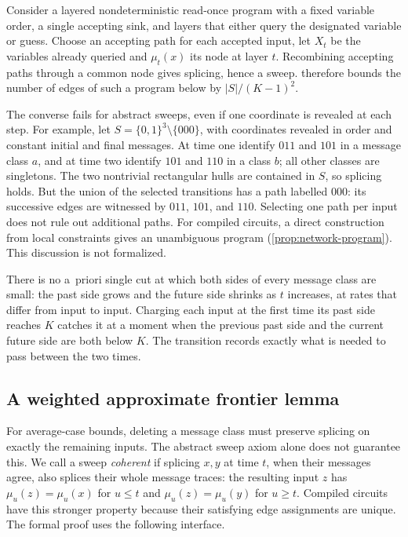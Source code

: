 \documentclass[11pt]{article}
\theoremstyle{plain}
\theoremstyle{definition}
\theoremstyle{remark}
\newcommand{\card}[1]{\lvert #1\rvert}
\begin{document}
\begin{remark}
\label{rem:programs}
Consider a layered nondeterministic read-once program with a fixed variable order, a single
accepting sink, and layers that either query the designated variable or guess. Choose an
accepting path for each accepted input, let $X_t$ be the variables already queried and
$\mu_t(x)$ its node at layer $t$. Recombining accepting paths through a common node gives
splicing, hence a sweep.  therefore bounds the number of edges of such a
program below by $\card S/(K-1)^2$.

The converse fails for abstract sweeps, even if one coordinate is revealed at each step. For
example, let $S=\{0,1\}^3\setminus\{000\}$, with coordinates revealed in order and constant
initial and final messages. At time one identify $011$ and $101$ in a message class $a$, and at
time two identify $101$ and $110$ in a class $b$; all other classes are singletons. The two
nontrivial rectangular hulls are contained in $S$, so splicing holds. But the union of the
selected transitions has a path labelled $000$: its successive edges are witnessed by
$011$, $101$, and $110$. Selecting one path per input does not rule out additional paths.
For compiled circuits, a direct construction from local constraints gives an unambiguous
program (\cref{prop:network-program}). This discussion is not formalized.
\end{remark}

\begin{remark}
There is no a~priori single cut at which both sides of every message class are small: the past
side grows and the future side shrinks as $t$ increases, at rates that differ from input to
input. Charging each input at the first time its past side reaches $K$ catches it at a moment
when the previous past side and the current future side are both below $K$. The transition
records exactly what is needed to pass between the two times.
\end{remark}

\subsection{A weighted approximate frontier lemma}
\label{sec:weighted}

For average-case bounds, deleting a message class must preserve splicing on exactly the
remaining inputs. The abstract sweep axiom alone does not guarantee this. We call a sweep
\emph{coherent} if splicing $x,y$ at time $t$, when their messages agree, also splices their
whole message traces: the resulting input $z$ has $\mu_u(z)=\mu_u(x)$ for $u\le t$ and
$\mu_u(z)=\mu_u(y)$ for $u\ge t$. Compiled circuits have this stronger property because
their satisfying edge assignments are unique. The formal proof uses the following interface.
\end{document}
